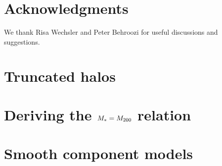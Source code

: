 \documentclass[useAMS,usenatbib]{mn2e}
\begin{document}





\section*{Acknowledgments}
 
We thank Risa Wechsler and Peter Behroozi for useful discussions and 
suggestions.



\appendix

\section{Truncated \LCDM halos}
\label{appendix:halos}

\section{Deriving the $M_{*}=M_{\rm 200}$ relation}
\label{appendix:MSMH}

\section{Smooth component models}
\label{appendix:smooth}





% 





\label{lastpage}
\bsp
\end{document}
